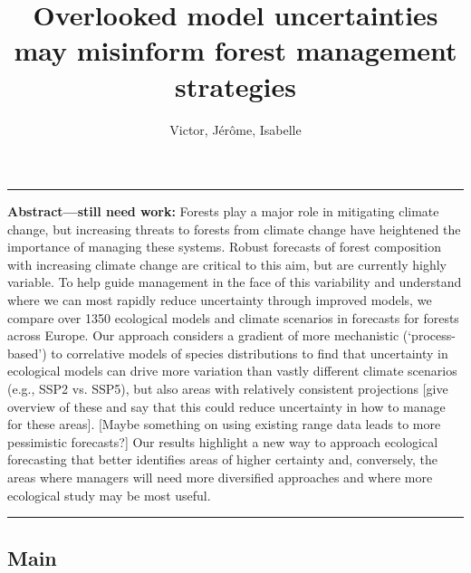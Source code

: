 \documentclass[11pt,letter]{article}
\begin{document}
\title{Overlooked model uncertainties may misinform forest management strategies}

\author{Victor, Jérôme, Isabelle} %
\date{}
\maketitle 


\noindent\rule{\textwidth}{0.3pt}
\textbf{Abstract---still need work:} Forests play a major role in mitigating climate change, but increasing threats to forests from climate change have heightened the importance of managing these systems. Robust forecasts of forest composition with increasing climate change are critical to this aim, but are currently highly variable. To help guide management in the face of this variability and understand where we can most rapidly reduce uncertainty through improved models, we compare over 1350 ecological models and climate scenarios in forecasts for forests across Europe. Our approach considers a gradient of more mechanistic (`process-based') to correlative models of species distributions to find that uncertainty in ecological models can drive more variation than vastly different climate scenarios (e.g., SSP2 vs. SSP5), but also areas with relatively consistent projections [give overview of these and say that this could reduce uncertainty in how to manage for these areas]. [Maybe something on using existing range data leads to more pessimistic forecasts?] Our results highlight a new way to approach ecological forecasting that better identifies areas of higher certainty and, conversely, the areas where managers will need more diversified approaches and where more ecological study may be most useful.

\noindent\rule{\textwidth}{0.3pt}

\linenumbers

\subsection*{Main}
%
\end{document}
